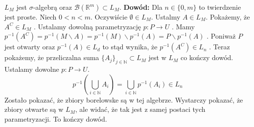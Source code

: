 \begin{tw}
    $L_M$ jest $\sigma$-algebrą oraz $\mathcal{B}(\mathbb{R}^m) \subset L_M$.
    \newline
    \textbf{Dowód:}\newline
    Dla $n \in \{0, m\}$ to twierdzenie jest proste. Niech $0 < n < m$. Oczywiście $\emptyset \in L_M$. Ustalmy $A \in L_M$. 
    Pokażemy, że $A^C \in L_M$ . Ustalamy dowolną parametryzację $p: P \rightarrow U$ . Mamy $p^{-1}(A^C) = p^{-1}(M \backslash A) = p^{-1}(M) \backslash p^{-1}(A) = P \backslash p^{-1}(A)$ . Poniważ $P$ jest otwarty oraz $p^{-1}(A) \in L_d$ to stąd wynika, że $p^{-1}(A^C) \in L_n$ .
    Teraz pokażemy, że przeliczalna suma $\{A_j\}_{j \in \mathbb{N}} \subset L_M$ jest w $L_M$ co kończy dowód. Ustalamy dowolne $p: P \rightarrow U$. $$ 
    p^{-1}(\bigcup_{i \in \mathbb{N}} A_i ) = \bigcup_{i \in \mathbb{N}} p^{-1}(A_i) \in L_n
    $$ Zostało pokazać, że zbiory borelowske są w tej algebrze. Wystarczy pokazać, że zbiory otwarte są w $L_M$, ale widać, że tak jest z samej postaci tych parametryzacji. To kończy dowód.  
\end{tw}